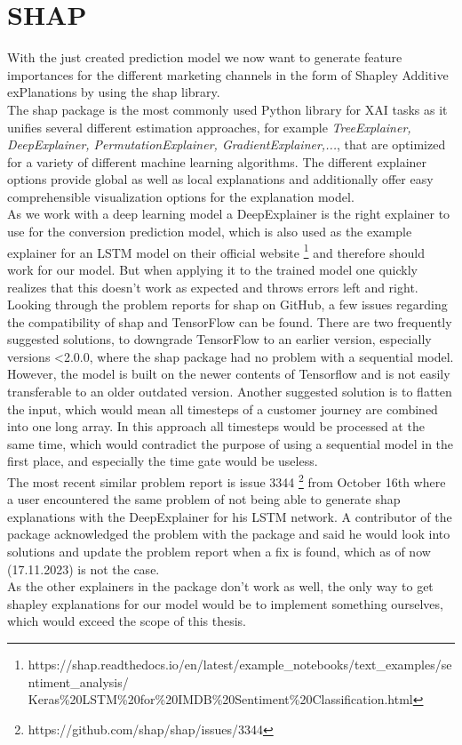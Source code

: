 \section{SHAP}
With the just created prediction model we now want to generate feature importances for the different marketing channels in the form of Shapley Additive exPlanations by using the shap library. \\
The shap package is the most commonly used Python library for XAI tasks as it unifies several different estimation approaches, for example \textit{TreeExplainer, DeepExplainer, PermutationExplainer, GradientExplainer,...}, that are optimized for a variety of different machine learning algorithms. The different explainer options provide global as well as local explanations and additionally offer easy comprehensible visualization options for the explanation model. 
\\ 
As we work with a deep learning model a DeepExplainer is the right explainer to use for the conversion prediction model, which is also used as the example explainer for an LSTM model on their official website
\footnote{https://shap.readthedocs.io/en/latest/example\_notebooks/text\_examples/sentiment\_analysis/\\Keras\%20LSTM\%20for\%20IMDB\%20Sentiment\%20Classification.html} and therefore should work for our model. 
But when applying it to the trained model one quickly realizes that this doesn't work as expected and throws errors left and right. 
Looking through the problem reports for shap on GitHub, a few issues regarding the compatibility of shap and TensorFlow can be found. There are two frequently suggested solutions, to downgrade TensorFlow to an earlier version, especially versions <2.0.0, where the shap package had no problem with a sequential model. However, the model is built on the newer contents of Tensorflow and is not easily transferable to an older outdated version. 
Another suggested solution is to flatten the input, which would mean all timesteps of a customer journey are combined into one long array. In this approach all timesteps would be processed at the same time, which would contradict the purpose of using a sequential model in the first place, and especially the time gate would be useless.\\
The most recent similar problem report is issue 3344 \footnote{https://github.com/shap/shap/issues/3344} from October 16th where a user encountered the same problem of not being able to generate shap explanations with the DeepExplainer for his LSTM network. A contributor of the package acknowledged the problem with the package and said he would look into solutions and update the problem report when a fix is found, which as of now \color{red}(17.11.2023) \color{black} is not the case.\\
As the other explainers in the package don't work as well, the only way to get shapley explanations for our model would be to implement something ourselves, which would exceed the scope of this thesis. 

